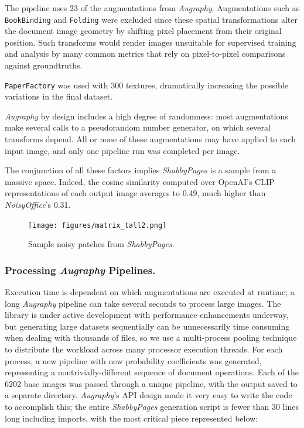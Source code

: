 \documentclass[runningheads]{llncs}
\begin{document}
The pipeline uses 23 of the augmentations from \emph{Augraphy}.  Augmentations such as \texttt{BookBinding} and \texttt{Folding} were excluded since these spatial transformations alter the document image geometry by shifting pixel placement from their original position.  Such transforms would render images unsuitable for supervised training and analysis by many common metrics that rely on pixel-to-pixel comparisons against groundtruths.

\texttt{PaperFactory} was used with 300 textures, dramatically increasing the possible variations in the final dataset.

\emph{Augraphy} by design includes a high degree of randomness: most augmentations make several calls to a pseudorandom number generator, on which several transforms depend.
All or none of these augmentations may have applied to each input image, and only one pipeline run was completed per image.

The conjunction of all these factors implies \emph{ShabbyPages} is a sample from a massive space.
Indeed, the cosine similarity computed over OpenAI's CLIP representations of each output image averages to 0.49, much higher than \emph{NoisyOffice}'s 0.31.

\begin{figure}
    \texttt{[image: figures/matrix\_tall2.png]}
    \caption{Sample noisy patches from \emph{ShabbyPages}.}
    \label{fig:matrix_tall2}
\end{figure}

\subsubsection{Processing \emph{Augraphy} Pipelines.}
Execution time is dependent on which augmentations are executed at runtime; a long \emph{Augraphy} pipeline can take several seconds to process large images.
The library is under active development with performance enhancements underway, but generating large datasets sequentially can be unnecessarily time consuming when dealing with thousands of files, so we use a multi-process pooling technique to distribute the workload across many processor execution threads.
For each process, a new pipeline with new probability coefficients was generated, representing a nontrivially-different sequence of document operations.
Each of the 6202 base images was passed through a unique pipeline, with the output saved to a separate directory.
\emph{Augraphy}'s API design made it very easy to write the code to accomplish this; the entire \emph{ShabbyPages} generation script is fewer than 30 lines long including imports, with the most critical piece represented below:
\end{document}
